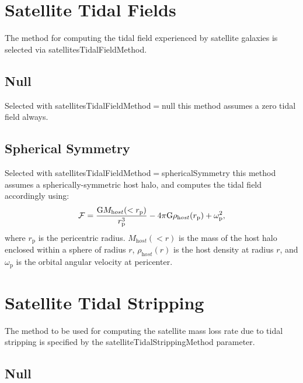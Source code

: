 \section{Satellite Tidal Fields}\label{sec:SatelliteTidalFields}

The method for computing the tidal field experienced by satellite galaxies is selected via {\normalfont \ttfamily satellitesTidalFieldMethod}.

\subsection{Null}

Selected with {\normalfont \ttfamily satellitesTidalFieldMethod}$=${\normalfont \ttfamily null} this method assumes a zero tidal field always.

\subsection{Spherical Symmetry}

Selected with {\normalfont \ttfamily satellitesTidalFieldMethod}$=${\normalfont \ttfamily sphericalSymmetry} this method assumes a spherically-symmetric host halo, and computes the tidal field accordingly using:
\begin{equation}
 \mathcal{F} = {{\mathrm G} M_{\mathrm host}(<r_{\mathrm p}) \over r_{\mathrm p}^3} - 4 \pi {\mathrm G} \rho_{\mathrm host}(r_{\mathrm p}) + \omega_{\mathrm p}^2,
\end{equation}
where $r_{\mathrm p}$ is the pericentric radius. $M_{\mathrm host}(<r)$ is the mass of the host halo enclosed within a sphere of radius $r$, $\rho_{\mathrm host}(r)$ is the host density at radius $r$, and $\omega_{\mathrm p}$ is the orbital angular velocity at pericenter.

\section{Satellite Tidal Stripping} \label{sec:satelliteTidalStrippingMethod}

The method to be used for computing the satellite mass loss rate due to tidal stripping is specified by the {\normalfont \ttfamily satelliteTidalStrippingMethod} parameter.

\subsection{Null}

